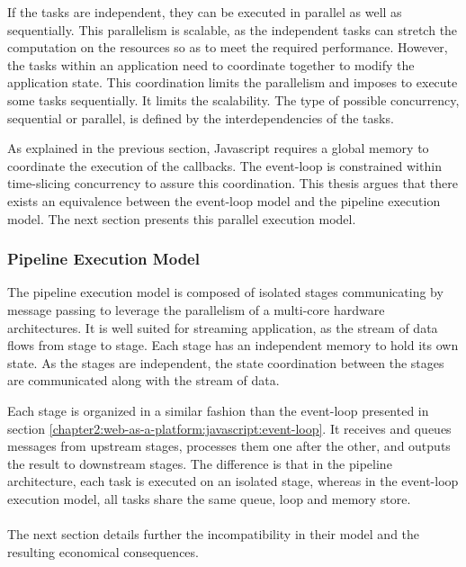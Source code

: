 If the tasks are independent, they can be executed in parallel as well as sequentially.
This parallelism is scalable, as the independent tasks can stretch the computation on the resources so as to meet the required performance.
However, the tasks within an application need to coordinate together to modify the application state.
This coordination limits the parallelism and imposes to execute some tasks sequentially.
It limits the scalability.
The type of possible concurrency, sequential or parallel, is defined by the interdependencies of the tasks.

As explained in the previous section, Javascript requires a global memory to coordinate the execution of the callbacks.
The event-loop is constrained within time-slicing concurrency to assure this coordination.
This thesis argues that there exists an equivalence between the event-loop model and the pipeline execution model.
The next section presents this parallel execution model.

\subsubsection{Pipeline Execution Model}

The pipeline execution model is composed of isolated stages communicating by message passing to leverage the parallelism of a multi-core hardware architectures.
It is well suited for streaming application, as the stream of data flows from stage to stage.
Each stage has an independent memory to hold its own state.
As the stages are independent, the state coordination between the stages are communicated along with the stream of data.


Each stage is organized in a similar fashion than the event-loop presented in section \ref{chapter2:web-as-a-platform:javascript:event-loop}.
It receives and queues messages from upstream stages, processes them one after the other, and outputs the result to downstream stages.
The difference is that in the pipeline architecture, each task is executed on an isolated stage, whereas in the event-loop execution model, all tasks share the same queue, loop and memory store.

\paragraph{}

The next section details further the incompatibility in their model and the resulting economical consequences.
